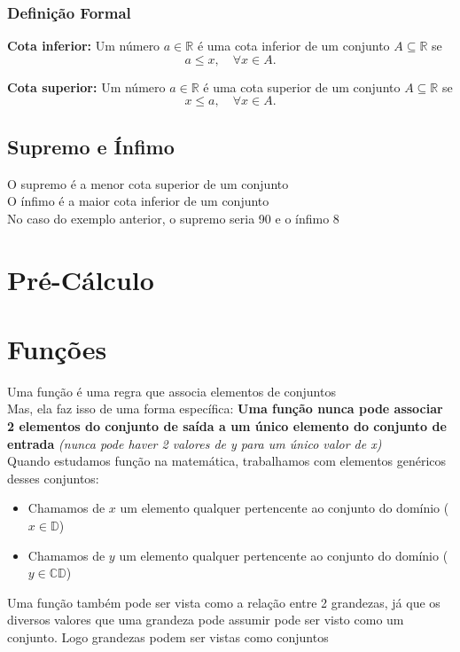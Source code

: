 \documentclass{article}
\begin{document}
\subsubsection{Definição Formal}
\textbf{Cota inferior:}
Um número $a \in \mathbb{R}$ é uma cota inferior de um conjunto $A \subseteq \mathbb{R}$ se
\[
a \leq x,\quad \forall x \in A.
\]

\textbf{Cota superior:}
Um número $a \in \mathbb{R}$ é uma cota superior de um conjunto $A \subseteq \mathbb{R}$ se
\[
x \leq a,\quad \forall x \in A.
\]

\subsection{Supremo e Ínfimo}
O supremo é a menor cota superior de um conjunto
\\[2pt]
O ínfimo é a maior cota inferior de um conjunto
\\[2pt]
No caso do exemplo anterior, o supremo seria 90 e o ínfimo 8

\section{Pré-Cálculo}

\section{Funções}
Uma função é uma regra que associa elementos de conjuntos
\\[2pt]
Mas, ela faz isso de uma forma específica: \textbf{Uma função nunca pode associar 2 elementos do conjunto de saída a um único elemento do conjunto de entrada} \textit{(nunca pode haver 2 valores de y para um único valor de x)}
\\[5pt]
Quando estudamos função na matemática, trabalhamos com elementos genéricos desses conjuntos:
\begin{itemize}
    \item Chamamos de $x$ um elemento qualquer pertencente ao conjunto do domínio ($x \in \mathbb{D}$)

    \item Chamamos de $y$ um elemento qualquer pertencente ao conjunto do domínio ($y \in \mathbb{CD}$)
\end{itemize}
Uma função também pode ser vista como a relação entre 2 grandezas, já que os diversos valores que uma grandeza pode assumir pode ser visto como um conjunto. Logo grandezas podem ser vistas como conjuntos
\end{document}
